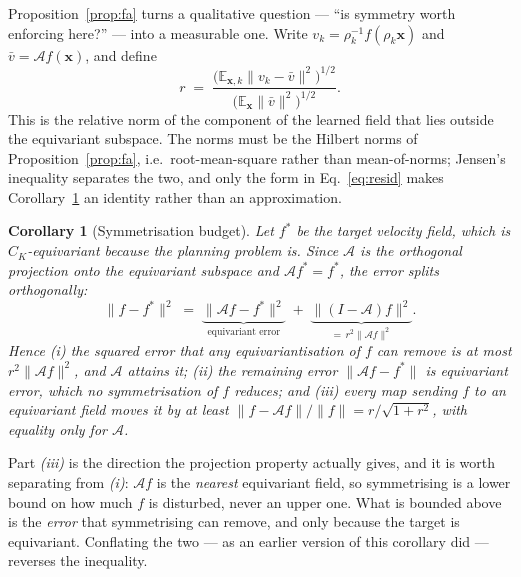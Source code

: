 \documentclass[10pt,twocolumn,letterpaper]{article}
\theoremstyle{plain}
\newtheorem{corollary}[proposition]{Corollary}
\begin{document}
Proposition~\ref{prop:fa} turns a qualitative question --- ``is symmetry worth
enforcing here?'' --- into a measurable one. Write $v_k=\rho_k^{-1}f(\rho_k\mathbf{x})$
and $\bar v=\mathcal{A}f(\mathbf{x})$, and define
\begin{equation}
  r \;=\;
  \frac{\bigl(\mathbb{E}_{\mathbf{x},k}\bigl\|v_k-\bar v\bigr\|^2\bigr)^{1/2}}
       {\bigl(\mathbb{E}_{\mathbf{x}}\bigl\|\bar v\bigr\|^2\bigr)^{1/2}} .
  \label{eq:resid}
\end{equation}
This is the relative norm of the component of the learned field that lies outside
the equivariant subspace. The norms must be the Hilbert norms of
Proposition~\ref{prop:fa}, i.e.\ root-mean-square rather than mean-of-norms;
Jensen's inequality separates the two, and only the form in
Eq.~\eqref{eq:resid} makes Corollary~\ref{cor:budget} an identity rather than an
approximation.

\begin{corollary}[Symmetrisation budget]
\label{cor:budget}
Let $f^\ast$ be the target velocity field, which is $C_K$-equivariant because the
planning problem is. Since $\mathcal{A}$ is the orthogonal projection onto the
equivariant subspace and $\mathcal{A}f^\ast=f^\ast$, the error splits
orthogonally:
\begin{equation}
  \|f-f^\ast\|^2 \;=\; \underbrace{\|\mathcal{A}f-f^\ast\|^2}_{\text{equivariant error}}
  \;+\; \underbrace{\|(I-\mathcal{A})f\|^2}_{=\,r^2\|\mathcal{A}f\|^2}.
  \label{eq:budget}
\end{equation}
Hence \emph{(i)} the squared error that any equivariantisation of $f$ can remove
is at most $r^2\|\mathcal{A}f\|^2$, and $\mathcal{A}$ attains it; \emph{(ii)} the
remaining error $\|\mathcal{A}f-f^\ast\|$ is equivariant error, which no
symmetrisation of $f$ reduces; and \emph{(iii)} every map sending $f$ to an
equivariant field moves it by \emph{at least}
$\|f-\mathcal{A}f\|/\|f\| = r/\sqrt{1+r^2}$, with equality only for $\mathcal{A}$.
\end{corollary}

Part \emph{(iii)} is the direction the projection property actually gives, and it
is worth separating from \emph{(i)}: $\mathcal{A}f$ is the \emph{nearest}
equivariant field, so symmetrising is a lower bound on how much $f$ is disturbed,
never an upper one. What is bounded above is the \emph{error} that symmetrising
can remove, and only because the target is equivariant. Conflating the two --- as
an earlier version of this corollary did --- reverses the inequality.
\end{document}

